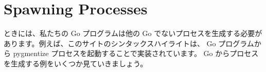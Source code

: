 \section{Spawning Processes}

ときには、私たちの Go プログラムは他の Go でないプロセスを生成する必要があります。例えば、このサイトのシンタックスハイライトは、 Go プログラムから pygmentize プロセスを起動することで実装されています。 Go からプロセスを生成する例をいくつか見ていきましょう。




